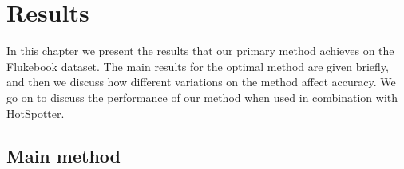 

\chapter{Results} \label{sec:results}

In this chapter we present the results that our primary method achieves on the Flukebook dataset.
The main results for the optimal method are given briefly, and then we discuss how different variations on the method affect accuracy.
We go on to discuss the performance of our method when used in combination with HotSpotter.

\section{Main method}

